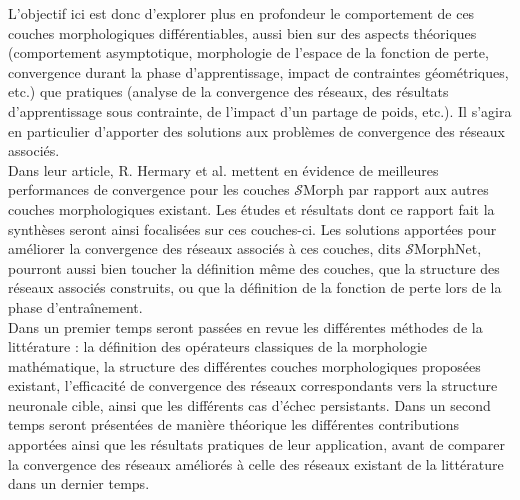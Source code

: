 \vspace{-1.6mm}
L’objectif ici est donc d’explorer plus en profondeur le comportement de ces couches morphologiques différentiables, aussi bien sur des aspects théoriques (comportement asymptotique, morphologie de l'espace de la fonction de perte, convergence durant la phase d’apprentissage, impact de contraintes géométriques, etc.) que pratiques (analyse de la convergence des réseaux, des résultats d'apprentissage sous contrainte, de l'impact d'un partage de poids, etc.). Il s'agira en particulier d'apporter des solutions aux problèmes de convergence des réseaux associés. \\

\vspace{-1.6mm}
Dans leur article, R. Hermary et al. \cite{Hermary_2022} mettent en évidence de meilleures performances de convergence pour les couches $\mathcal{S}$Morph par rapport aux autres couches morphologiques existant. Les études et résultats dont ce rapport fait la synthèses seront ainsi focalisées sur ces couches-ci. Les solutions apportées pour améliorer la convergence des réseaux associés à ces couches, dits $\mathcal{S}$MorphNet, pourront aussi bien toucher la définition même des couches, que la structure des réseaux associés construits, ou que la définition de la fonction de perte lors de la phase d'entraînement. \\

\vspace{-1.6mm}
Dans un premier temps seront passées en revue les différentes méthodes de la littérature : la définition des opérateurs classiques de la morphologie mathématique, la structure des différentes couches morphologiques proposées existant, l'efficacité de convergence des réseaux correspondants vers la structure neuronale cible, ainsi que les différents cas d'échec persistants.
Dans un second temps seront présentées de manière théorique les différentes contributions apportées ainsi que les résultats pratiques de leur application, avant de comparer la convergence des réseaux améliorés à celle des réseaux existant de la littérature dans un dernier temps.
